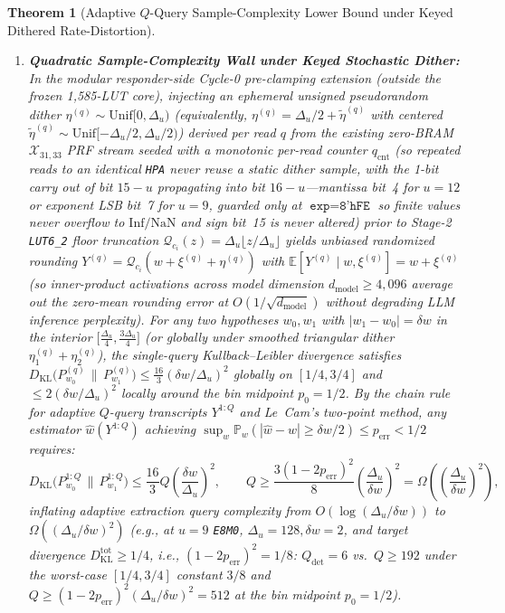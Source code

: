 \documentclass[10pt,twocolumn]{article}
\providecommand{\CoreClbLuts}{1,585}
\providecommand{\CorePhysicalLUTs}{\CoreClbLuts}
\theoremstyle{spectralthm}
\newtheorem{theorem}{Theorem}[section]
\begin{document}
\begin{theorem}[Adaptive $Q$-Query Sample-Complexity Lower Bound under Keyed Dithered Rate-Distortion]
\begin{enumerate}
  \item[(ii)] \textbf{Quadratic Sample-Complexity Wall under Keyed Stochastic Dither:} In the modular responder-side Cycle-0 pre-clamping extension (outside the frozen \CorePhysicalLUTs-LUT core), injecting an ephemeral unsigned pseudorandom dither $\eta^{(q)} \sim \mathrm{Unif}[0, \Delta_u)$ (equivalently, $\eta^{(q)} = \Delta_u/2 + \tilde{\eta}^{(q)}$ with centered $\tilde{\eta}^{(q)} \sim \mathrm{Unif}[-\Delta_u/2, \Delta_u/2)$) derived per read $q$ from the existing zero-BRAM $\mathcal{X}_{31,33}$ PRF stream seeded with a monotonic per-read counter $q_{\mathrm{cnt}}$ (so repeated reads to an identical \texttt{HPA} never reuse a static dither sample, with the 1-bit carry out of bit $15-u$ propagating into bit $16-u$---mantissa bit~4 for $u=12$ or exponent LSB bit~7 for $u=9$, guarded only at $\texttt{exp} = \texttt{8'hFE}$ so finite values never overflow to $\mathrm{Inf}/\mathrm{NaN}$ and sign bit~15 is never altered) prior to Stage-2 \mbox{\texttt{LUT6\_2}} floor truncation $\mathcal{Q}_{c_i}(z) = \Delta_u \lfloor z/\Delta_u \rfloor$ yields unbiased randomized rounding $Y^{(q)} = \mathcal{Q}_{c_i}(w + \xi^{(q)} + \eta^{(q)})$ with $\mathbb{E}[Y^{(q)} \mid w, \xi^{(q)}] = w + \xi^{(q)}$ (so inner-product activations across model dimension $d_{\mathrm{model}} \ge 4,096$ average out the zero-mean rounding error at $O(1/\sqrt{d_{\mathrm{model}}})$ without degrading LLM inference perplexity). For any two hypotheses $w_0, w_1$ with $|w_1 - w_0| = \delta w$ in the interior $\bigl[\frac{\Delta_u}{4}, \frac{3\Delta_u}{4}\bigr]$ (or globally under smoothed triangular dither $\eta_1^{(q)} + \eta_2^{(q)}$), the single-query Kullback--Leibler divergence satisfies $D_{\mathrm{KL}}\bigl(P_{w_0}^{(q)} \,\|\, P_{w_1}^{(q)}\bigr) \le \frac{16}{3}(\delta w / \Delta_u)^2$ globally on $[1/4, 3/4]$ and $\le 2(\delta w/\Delta_u)^2$ locally around the bin midpoint $p_0 = 1/2$. By the chain rule for adaptive $Q$-query transcripts $Y^{1:Q}$ and Le~Cam's two-point method, any estimator $\hat{w}(Y^{1:Q})$ achieving $\sup_w \mathbb{P}_w(|\hat{w} - w| \ge \delta w/2) \le p_{\mathrm{err}} < 1/2$ requires:
  \begin{equation}
  \label{eq:lecam_dither}
  D_{\mathrm{KL}}\bigl(P_{w_0}^{1:Q} \,\|\, P_{w_1}^{1:Q}\bigr) \le \frac{16}{3} Q \left(\frac{\delta w}{\Delta_u}\right)^2,\qquad
  Q \ge \frac{3(1 - 2p_{\mathrm{err}})^2}{8}\left(\frac{\Delta_u}{\delta w}\right)^2 = \Omega\left(\left(\frac{\Delta_u}{\delta w}\right)^2\right),
  \end{equation}
  inflating adaptive extraction query complexity from $O(\log(\Delta_u/\delta w))$ to $\Omega((\Delta_u/\delta w)^2)$ (e.g., at $u=9$ \texttt{E8M0}, $\Delta_u = 128, \delta w = 2$, and target divergence $D_{\mathrm{KL}}^{\mathrm{tot}} \ge 1/4$, i.e., $(1-2p_{\mathrm{err}})^2 = 1/8$: $Q_{\mathrm{det}} = 6$ vs.\ $Q \ge 192$ under the worst-case $[1/4,3/4]$ constant $3/8$ and $Q \ge (1 - 2p_{\mathrm{err}})^2(\Delta_u/\delta w)^2 = 512$ at the bin midpoint $p_0 = 1/2$).
\end{enumerate}
\end{theorem}
\end{document}
